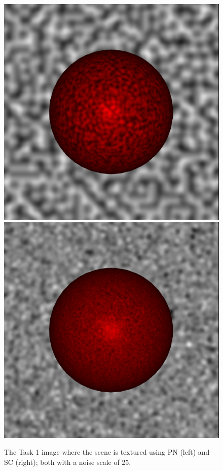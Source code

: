 \documentclass[12pt,fleqn]{article}
\begin{document}
\label{sec:results}
\begin{figure}[H]
    \centering
        \includegraphics[width=.48\linewidth]{t1-perlin}
        \includegraphics[width=.48\linewidth]{t1-sc}
    \caption{
        The Task 1 image where the scene is textured using PN (left) and SC (right); both with a noise scale of 25.
    }
    \label{fig:t1}
\end{figure}\noindent
\end{document}
